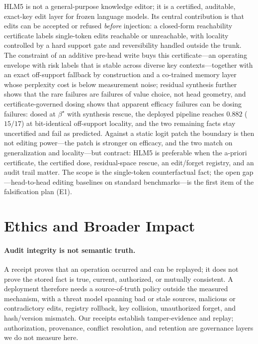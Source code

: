\documentclass[10pt,twocolumn]{article}
\theoremstyle{remark}
\begin{document}
HLM5 is not a general-purpose knowledge editor; it is a certified, auditable,
exact-key edit layer for frozen language models. Its central contribution is that
edits can be accepted or refused \emph{before} injection: a closed-form
reachability certificate labels single-token edits reachable or unreachable, with
locality controlled by a hard support gate and reversibility handled outside the
trunk. The constraint of an additive pre-head write buys this certificate---an
operating envelope with risk labels that is stable across diverse key
contexts---together with an exact off-support fallback by construction and a
co-trained memory layer whose perplexity cost is below measurement noise;
residual synthesis further shows that the rare failures are failures of value
choice, not head geometry, and certificate-governed dosing shows that apparent
efficacy failures can be dosing failures: dosed at $\beta^{\star}$ with
synthesis rescue, the deployed pipeline reaches $0.882$ ($15/17$) at
bit-identical off-support locality, and the two remaining facts stay
uncertified and fail as predicted. Against a static logit patch the boundary
is then not editing power---the patch is stronger on efficacy, and the two
match on generalization and locality---but contract: HLM5
is preferable when the a-priori certificate, the certified dose, residual-space
rescue, an edit/forget registry, and an audit trail matter.
The scope is the single-token counterfactual fact; the open gap---head-to-head
editing baselines on standard benchmarks---is the first item of the
falsification plan (E1).

\section*{Ethics and Broader Impact}

\paragraph{Audit integrity is not semantic truth.} A receipt proves that an
operation occurred and can be replayed; it does not prove the stored fact is true,
current, authorized, or mutually consistent. A deployment therefore needs a
source-of-truth policy outside the measured mechanism, with a threat model
spanning bad or stale sources, malicious or contradictory edits, registry
rollback, key collision, unauthorized forget, and hash/version mismatch. Our
receipts establish tamper-evidence and replay; authorization, provenance, conflict
resolution, and retention are governance layers we do not measure here.
\end{document}
